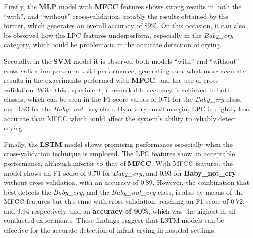 Firstly, the \textbf{MLP} model with \textbf{MFCC} features shows strong results in both the “with”, and “without” cross-validation, notably the results obtained by the former, which generates an overall accuracy of 89\%. On this occasion, it can also be observed how the LPC features underperform, especially in the \textit{Baby\_cry} category, which could be problematic in the accurate detection of crying.

Secondly, in the \textbf{SVM} model it is observed both models “with” and “without” cross-validation present a solid performance, generating somewhat more accurate results in the experiments performed with \textbf{MFCC}, and the use of cross-validation. With this experiment, a remarkable accuracy is achieved in both classes, which can be seen in the F1-score values of 0.71 for the \textit{Baby\_cry} class, and 0.93 for the \textit{Baby\_not\_cry} class. By a very small margin, LPC is slightly less accurate than MFCC which could affect the system's ability to reliably detect crying. 


Finally, the \textbf{LSTM} model shows promising performance especially when the cross-validation technique is employed. The LPC features show an acceptable performance, although inferior to that of \textbf{MFCC}. With MFCC features, the model shows an F1-score of 0.70 for \textit{Baby\_cry}, and 0.93 for \textbf{Baby\_not\_cry} without cross-validation, with an accuracy of 0.89. However, the combination that best detects the \textit{Baby\_cry}, and the \textit{Baby\_not\_cry} class, is also by means of the MFCC features but this time with cross-validation, reaching an F1-score of 0.72, and 0.94 respectively, and an \textbf{accuracy of 90\%}, which was the highest in all conducted experiments. These findings suggest that LSTM models can be effective for the accurate detection of infant crying in hospital settings.


